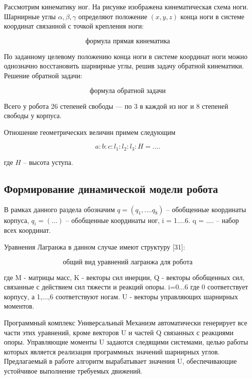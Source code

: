Рассмотрим кинематику ног. На рисунке  изображена кинематическая схема ноги. Шарнирные углы $\alpha,\beta,\gamma$ определяют положение $(x,y,z)$ конца ноги в системе координат связанной с точкой крепления ноги:

\begin{equation}
  \text{формула прямая кинематика}
\end{equation}

По заданному целевому положению конца ноги в системе координат ноги можно однозначно восстановить шарнирные углы, решив задачу обратной кинематики. Решение обратной задачи:

\begin{equation}
  \text{формула обратной задачи}  
\end{equation}

Всего у робота 26 степеней свободы --- по 3 в каждой из ног и 8 степеней свободы у корпуса.

Отношение геометрических величин примем следующим

\begin{equation}
\label{articulated:ratio}
  a:b:c:l_1:l_2:l_3:H = ....
\end{equation}

где $H$ -- высота уступа.

\subsection{Формирование динамической модели робота}
В рамках данного раздела обозначим $q = (q_1, ....q_8)$ -- обобщенные координаты корпуса, $q_i = (...)$ -- обобщенные координаты ног, i = 1....6. q = .... -- набор всех координат.

Уравнения Лагранжа в данном случае имеют структуру [31]:

\begin{equation}
\text{общий вид уравнений лагранжа для робота}
\end{equation}

где M - матрицы масс, K - векторы сил инерции, Q  - векторы обобщенных сил, связанные с действием сил тяжести и реакций опоры. i=0...6 где 0 соответствует корпусу, а 1,...,6 соответствуют ногам. U - векторы управляющих шарнирных моментов.

Программный комплекс Универсальный Механизм автоматически генерирует все части этих уравнений, кроме векторов U и  частей Q связанных с реакциями опоры. Управляющие моменты U задаются следящими системами, целью работы которых является реализация программных значений шарнирных углов. Предлагаемый в работе алгоритм вырабатывает значения U, обеспечивающие устойчивое выполнение требуемых движений.


